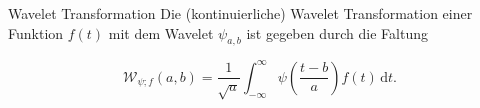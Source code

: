 \documentclass[aspectratio=169, 12pt]{beamer}
\begin{document}

\begin{frame}{Wavelet Transformation}
  Die (kontinuierliche) Wavelet Transformation einer Funktion $f(t)$ mit dem Wavelet $\psi_{a, b}$ ist gegeben durch die Faltung
  \vspace{-0.4cm}
  \begin{small}
    \begin{equation*}
      \mathcal{W}_{\psi; f}(a, b) = \frac{1}{\sqrt{a}} \int_{-\infty}^{\infty} \psi \left( \frac{t-b}{a} \right) f(t) \, \text{d}t.
    \end{equation*}
  \end{small}
  \vspace{-0.35cm}
  \begin{center}
    \qquad
  \end{center}
\end{frame}
\end{document}
